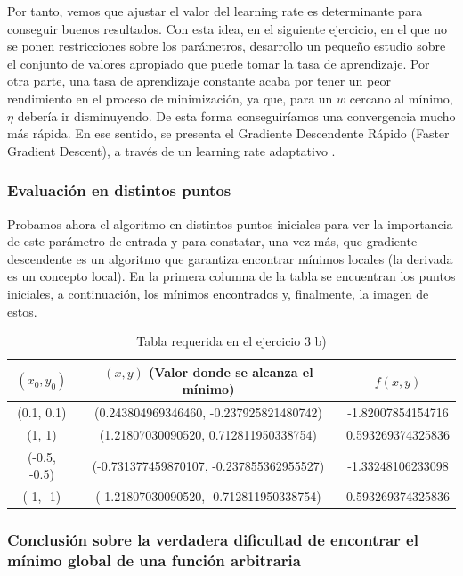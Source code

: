 Por tanto, vemos que ajustar el valor del learning rate es determinante para conseguir buenos resultados. Con esta idea, en el siguiente ejercicio, en el que no se ponen restricciones sobre los parámetros, desarrollo un pequeño estudio sobre el conjunto de valores apropiado que puede tomar la tasa de aprendizaje. Por otra parte, una tasa de aprendizaje constante acaba por tener un peor rendimiento en el proceso de minimización, ya que, para un $w$ cercano al mínimo, $\eta$ debería ir disminuyendo. De esta forma conseguiríamos una convergencia mucho más rápida. En ese sentido, se presenta el Gradiente Descendente Rápido (Faster Gradient Descent), a través de un learning rate adaptativo \cite{fgd}.

\subsubsection{Evaluación en distintos puntos}

Probamos ahora el algoritmo en distintos puntos iniciales para ver la importancia de este parámetro de entrada y para constatar, una vez más, que gradiente descendente es un algoritmo que garantiza encontrar mínimos locales (la derivada es un concepto local). En la primera columna de la tabla se encuentran los puntos iniciales, a continuación, los mínimos encontrados y, finalmente, la imagen de estos.

\begin{table}[H]
	\begin{tabular}{|c|c|c|}
		\hline
		$(x_0,y_0)$   & $(x,y)$ (Valor donde se alcanza el mínimo)                                 & $f(x,y)$          \\ \hline
		(0.1, 0.1)   & (0.243804969346460, -0.237925821480742) & -1.82007854154716 \\ \hline
		(1, 1)       & (1.21807030090520, 0.712811950338754)    & 0.593269374325836 \\ \hline
		(-0.5, -0.5) & (-0.731377459870107, -0.237855362955527) & -1.33248106233098 \\ \hline
		(-1, -1)     & (-1.21807030090520, -0.712811950338754)  & 0.593269374325836 \\ \hline
	\end{tabular}
	\caption{Tabla requerida en el ejercicio 3 b)}
	\label{table1}
\end{table}

\subsubsection{Conclusión sobre la verdadera dificultad de encontrar el mínimo global de una función arbitraria}

